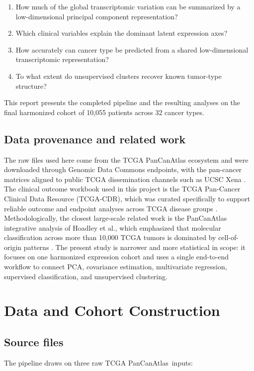 \documentclass[11pt]{article}
\newcommand{\tcga}{TCGA PanCanAtlas}
\begin{document}
\begin{enumerate}
  \item How much of the global transcriptomic variation can be summarized by a low-dimensional principal component representation?
  \item Which clinical variables explain the dominant latent expression axes?
  \item How accurately can cancer type be predicted from a shared low-dimensional transcriptomic representation?
  \item To what extent do unsupervised clusters recover known tumor-type structure?
\end{enumerate}

This report presents the completed pipeline and the resulting analyses on the final harmonized cohort of 10,055 patients across 32 cancer types.

\subsection{Data provenance and related work}
The raw files used here come from the TCGA PanCanAtlas ecosystem and were downloaded through Genomic Data Commons endpoints, with the pan-cancer matrices aligned to public TCGA dissemination channels such as UCSC Xena \cite{grossman2016shared,goldman2020xena}. The clinical outcome workbook used in this project is the TCGA Pan-Cancer Clinical Data Resource (TCGA-CDR), which was curated specifically to support reliable outcome and endpoint analyses across TCGA disease groups \cite{liu2018cdr}. Methodologically, the closest large-scale related work is the PanCanAtlas integrative analysis of Hoadley et al., which emphasized that molecular classification across more than 10,000 TCGA tumors is dominated by cell-of-origin patterns \cite{hoadley2018cell}. The present study is narrower and more statistical in scope: it focuses on one harmonized expression cohort and uses a single end-to-end workflow to connect PCA, covariance estimation, multivariate regression, supervised classification, and unsupervised clustering.

\section{Data and Cohort Construction}
\subsection{Source files}
The pipeline draws on three raw \tcga\ inputs:
\end{document}
